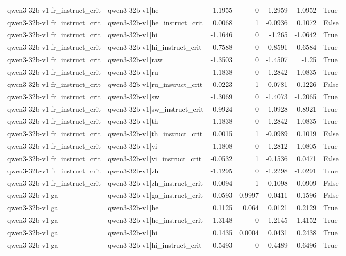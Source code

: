 \begin{table}
\begin{tabular}{l l r r r r l}
qwen3-32b-v1|fr_instruct_crit & qwen3-32b-v1|he & -1.1955 & 0 & -1.2959 & -1.0952 & True \\
qwen3-32b-v1|fr_instruct_crit & qwen3-32b-v1|he_instruct_crit & 0.0068 & 1 & -0.0936 & 0.1072 & False \\
qwen3-32b-v1|fr_instruct_crit & qwen3-32b-v1|hi & -1.1646 & 0 & -1.265 & -1.0642 & True \\
qwen3-32b-v1|fr_instruct_crit & qwen3-32b-v1|hi_instruct_crit & -0.7588 & 0 & -0.8591 & -0.6584 & True \\
qwen3-32b-v1|fr_instruct_crit & qwen3-32b-v1|raw & -1.3503 & 0 & -1.4507 & -1.25 & True \\
qwen3-32b-v1|fr_instruct_crit & qwen3-32b-v1|ru & -1.1838 & 0 & -1.2842 & -1.0835 & True \\
qwen3-32b-v1|fr_instruct_crit & qwen3-32b-v1|ru_instruct_crit & 0.0223 & 1 & -0.0781 & 0.1226 & False \\
qwen3-32b-v1|fr_instruct_crit & qwen3-32b-v1|sw & -1.3069 & 0 & -1.4073 & -1.2065 & True \\
qwen3-32b-v1|fr_instruct_crit & qwen3-32b-v1|sw_instruct_crit & -0.9924 & 0 & -1.0928 & -0.8921 & True \\
qwen3-32b-v1|fr_instruct_crit & qwen3-32b-v1|th & -1.1838 & 0 & -1.2842 & -1.0835 & True \\
qwen3-32b-v1|fr_instruct_crit & qwen3-32b-v1|th_instruct_crit & 0.0015 & 1 & -0.0989 & 0.1019 & False \\
qwen3-32b-v1|fr_instruct_crit & qwen3-32b-v1|vi & -1.1808 & 0 & -1.2812 & -1.0805 & True \\
qwen3-32b-v1|fr_instruct_crit & qwen3-32b-v1|vi_instruct_crit & -0.0532 & 1 & -0.1536 & 0.0471 & False \\
qwen3-32b-v1|fr_instruct_crit & qwen3-32b-v1|zh & -1.1295 & 0 & -1.2298 & -1.0291 & True \\
qwen3-32b-v1|fr_instruct_crit & qwen3-32b-v1|zh_instruct_crit & -0.0094 & 1 & -0.1098 & 0.0909 & False \\
qwen3-32b-v1|ga & qwen3-32b-v1|ga_instruct_crit & 0.0593 & 0.9997 & -0.0411 & 0.1596 & False \\
qwen3-32b-v1|ga & qwen3-32b-v1|he & 0.1125 & 0.064 & 0.0121 & 0.2129 & True \\
qwen3-32b-v1|ga & qwen3-32b-v1|he_instruct_crit & 1.3148 & 0 & 1.2145 & 1.4152 & True \\
qwen3-32b-v1|ga & qwen3-32b-v1|hi & 0.1435 & 0.0004 & 0.0431 & 0.2438 & True \\
qwen3-32b-v1|ga & qwen3-32b-v1|hi_instruct_crit & 0.5493 & 0 & 0.4489 & 0.6496 & True \\

\end{tabular}
\end{table}

